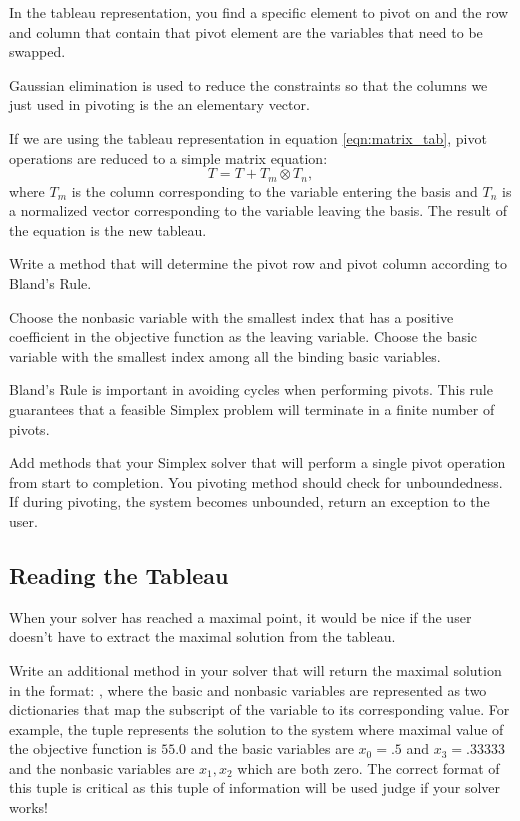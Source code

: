 In the tableau representation, you find a specific element to pivot on and the row and column that contain that pivot element are the variables that need to be swapped.

Gaussian elimination is used to reduce the constraints so that the columns we just used in pivoting is the an elementary vector.


If we are using the tableau representation in equation \ref{eqn:matrix_tab}, pivot operations are reduced to a simple matrix equation:
\[T = T + T_m \otimes T_n,\]
where $T_m$ is the column corresponding to the variable entering the basis and $T_n$ is a normalized vector corresponding to the variable leaving the basis.  The result of the equation is the new tableau.


\begin{problem}
Write a method that will determine the pivot row and pivot column according to Bland's Rule.
\begin{definition}
Choose the nonbasic variable with the smallest index that has a positive coefficient in the objective function
as the leaving variable.  Choose the basic variable with the smallest index among all the binding basic variables.
\end{definition}

Bland's Rule is important in avoiding cycles when performing pivots.
This rule guarantees that a feasible Simplex problem will terminate in a finite number of pivots.
\label{prob:blands}
\end{problem}

\begin{problem}
Add methods that your Simplex solver that will perform a single pivot operation from start to completion.
You pivoting method should check for unboundedness.  
If during pivoting, the system becomes unbounded, return an exception to the user.
\end{problem}

\subsection{Reading the Tableau}
When your solver has reached a maximal point, it would be nice if the user doesn't have to extract the maximal solution from the tableau.

\begin{problem}
Write an additional method in your solver that will return the maximal solution in the format: , where the basic and nonbasic variables are represented as two dictionaries that map the subscript of the variable to its corresponding value.
For example, the tuple  represents the solution to the system 
where maximal value of the objective function is $55.0$ and the 
basic variables are $x_0=.5$ and $x_3=.33333$ and the nonbasic variables are $x_1, x_2$ which are both zero.
The correct format of this tuple is critical as this tuple of information will be used judge if your solver works!
\end{problem}






